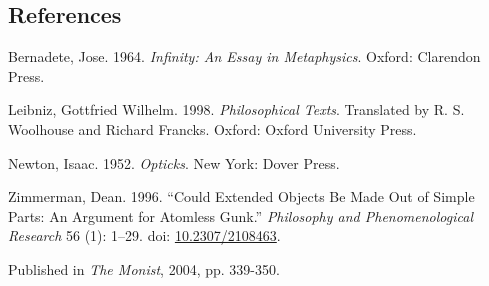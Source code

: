 \documentclass[
  10pt,
  letterpaper,
  DIV=11,
  numbers=noendperiod,
  twoside]{scrartcl}
\newlength{\cslhangindent}
\newenvironment{CSLReferences}[2] %
 {\begin{list}{}{%
  \setlength{\itemindent}{0pt}
  \setlength{\leftmargin}{0pt}
  \setlength{\parsep}{0pt}
  \ifodd #1
   \setlength{\leftmargin}{\cslhangindent}
   \setlength{\itemindent}{-1\cslhangindent}
  \fi
  \setlength{\itemsep}{#2\baselineskip}}}
 {\end{list}}
\begin{document}
\subsection*{References}\label{references}

\label{refs}
\begin{CSLReferences}{1}{0}
Bernadete, Jose. 1964. \emph{Infinity: An Essay in Metaphysics}. Oxford:
Clarendon Press.

Leibniz, Gottfried Wilhelm. 1998. \emph{Philosophical Texts}. Translated
by R. S. Woolhouse and Richard Francks. Oxford: Oxford University Press.

Newton, Isaac. 1952. \emph{Opticks}. New York: Dover Press.

Zimmerman, Dean. 1996. {``Could Extended Objects Be Made Out of Simple
Parts: An Argument for Atomless Gunk.''} \emph{Philosophy and
Phenomenological Research} 56 (1): 1--29. doi:
\href{https://doi.org/10.2307/2108463}{10.2307/2108463}.

\end{CSLReferences}



\noindent Published in\emph{
The Monist}, 2004, pp. 339-350.
\end{document}
